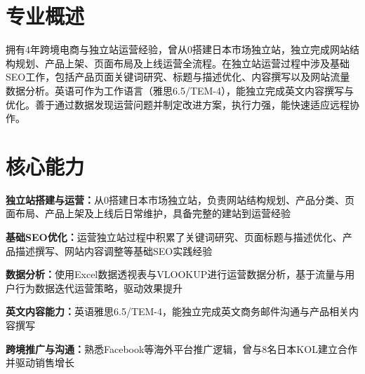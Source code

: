 \documentclass[11pt,a4paper,sans]{moderncv}
\begin{document}
\makecvtitle


\section{专业概述}

拥有4年跨境电商与独立站运营经验，曾从0搭建日本市场独立站，独立完成网站结构规划、产品上架、页面布局及上线运营全流程。在独立站运营过程中涉及基础SEO工作，包括产品页面关键词研究、标题与描述优化、内容撰写以及网站流量数据分析。英语可作为工作语言（雅思6.5/TEM-4），能独立完成英文内容撰写与优化。善于通过数据发现运营问题并制定改进方案，执行力强，能快速适应远程协作。


\section{核心能力}
\vspace{1pt}

\textbf{独立站搭建与运营：}从0搭建日本市场独立站，负责网站结构规划、产品分类、页面布局、产品上架及上线后日常维护，具备完整的建站到运营经验

\vspace{3pt}
\textbf{基础SEO优化：}运营独立站过程中积累了关键词研究、页面标题与描述优化、产品描述撰写、网站内容调整等基础SEO实践经验

\vspace{3pt}
\textbf{数据分析：}使用Excel数据透视表与VLOOKUP进行运营数据分析，基于流量与用户行为数据迭代运营策略，驱动效果提升

\vspace{3pt}
\textbf{英文内容能力：}英语雅思6.5/TEM-4，能独立完成英文商务邮件沟通与产品相关内容撰写

\vspace{3pt}
\textbf{跨境推广与沟通：}熟悉Facebook等海外平台推广逻辑，曾与8名日本KOL建立合作并驱动销售增长

\end{document}
